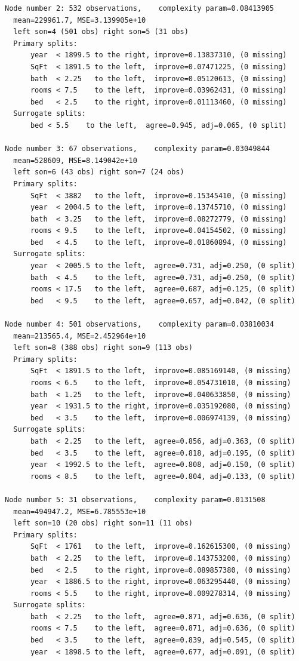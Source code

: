 \documentclass[11pt,a4paper]{article}
\begin{document}
\begin{lstlisting}[style=console]
Node number 2: 532 observations,    complexity param=0.08413905
  mean=229961.7, MSE=3.139905e+10 
  left son=4 (501 obs) right son=5 (31 obs)
  Primary splits:
      year  < 1899.5 to the right, improve=0.13837310, (0 missing)
      SqFt  < 1891.5 to the left,  improve=0.07471225, (0 missing)
      bath  < 2.25   to the left,  improve=0.05120613, (0 missing)
      rooms < 7.5    to the left,  improve=0.03962431, (0 missing)
      bed   < 2.5    to the right, improve=0.01113460, (0 missing)
  Surrogate splits:
      bed < 5.5    to the left,  agree=0.945, adj=0.065, (0 split)

Node number 3: 67 observations,    complexity param=0.03049844
  mean=528609, MSE=8.149042e+10 
  left son=6 (43 obs) right son=7 (24 obs)
  Primary splits:
      SqFt  < 3882   to the left,  improve=0.15345410, (0 missing)
      year  < 2004.5 to the left,  improve=0.13745710, (0 missing)
      bath  < 3.25   to the left,  improve=0.08272779, (0 missing)
      rooms < 9.5    to the left,  improve=0.04154502, (0 missing)
      bed   < 4.5    to the left,  improve=0.01860894, (0 missing)
  Surrogate splits:
      year  < 2005.5 to the left,  agree=0.731, adj=0.250, (0 split)
      bath  < 4.5    to the left,  agree=0.731, adj=0.250, (0 split)
      rooms < 17.5   to the left,  agree=0.687, adj=0.125, (0 split)
      bed   < 9.5    to the left,  agree=0.657, adj=0.042, (0 split)

Node number 4: 501 observations,    complexity param=0.03810034
  mean=213565.4, MSE=2.452964e+10 
  left son=8 (388 obs) right son=9 (113 obs)
  Primary splits:
      SqFt  < 1891.5 to the left,  improve=0.085169140, (0 missing)
      rooms < 6.5    to the left,  improve=0.054731010, (0 missing)
      bath  < 1.25   to the left,  improve=0.040633850, (0 missing)
      year  < 1931.5 to the right, improve=0.035192080, (0 missing)
      bed   < 3.5    to the left,  improve=0.006974139, (0 missing)
  Surrogate splits:
      bath  < 2.25   to the left,  agree=0.856, adj=0.363, (0 split)
      bed   < 3.5    to the left,  agree=0.818, adj=0.195, (0 split)
      year  < 1992.5 to the left,  agree=0.808, adj=0.150, (0 split)
      rooms < 8.5    to the left,  agree=0.804, adj=0.133, (0 split)

Node number 5: 31 observations,    complexity param=0.0131508
  mean=494947.2, MSE=6.785553e+10 
  left son=10 (20 obs) right son=11 (11 obs)
  Primary splits:
      SqFt  < 1761   to the left,  improve=0.162615300, (0 missing)
      bath  < 2.25   to the left,  improve=0.143753200, (0 missing)
      bed   < 2.5    to the right, improve=0.089857380, (0 missing)
      year  < 1886.5 to the right, improve=0.063295440, (0 missing)
      rooms < 5.5    to the right, improve=0.009278314, (0 missing)
  Surrogate splits:
      bath  < 2.25   to the left,  agree=0.871, adj=0.636, (0 split)
      rooms < 7.5    to the left,  agree=0.871, adj=0.636, (0 split)
      bed   < 3.5    to the left,  agree=0.839, adj=0.545, (0 split)
      year  < 1898.5 to the left,  agree=0.677, adj=0.091, (0 split)


\end{lstlisting}
\end{document}
